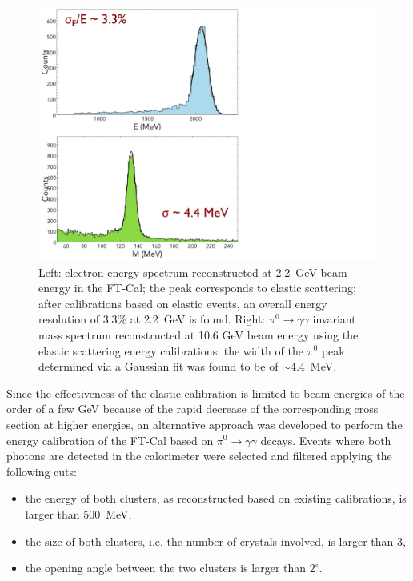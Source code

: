 \begin{figure}
\includegraphics[height=1.0\columnwidth]{fig/ftcal_elasticres.pdf}
\caption{Left: electron energy spectrum reconstructed at 2.2~GeV beam energy in the FT-Cal; the peak corresponds
  to elastic scattering; after calibrations based on elastic events, an overall energy resolution of 3.3\% at 2.2~GeV is
  found. Right: $\pi^0\to\gamma\gamma$ invariant mass spectrum reconstructed at 10.6 GeV beam energy using the
  elastic scattering energy calibrations: the width of the $\pi^0$ peak determined via a Gaussian fit was found to be
  of $\sim$4.4~MeV.}
\label{fig:ftcal_elasticres}
\end{figure}

Since the effectiveness of the elastic calibration is limited to beam energies of the order of a few GeV because of
the rapid decrease of the corresponding cross section at higher energies, an alternative approach was developed to
perform the energy calibration of the FT-Cal based on $\pi^0\to\gamma\gamma$ decays. Events where both
photons are detected in the calorimeter were selected and filtered applying the following cuts:
\begin{itemize}
    \item the energy of both clusters, as reconstructed based on existing calibrations, is larger than 500~MeV,
    \item the size of both clusters, i.e. the number of crystals involved, is larger than 3,
    \item the opening angle between the two clusters is larger than $2^\circ$.
\end{itemize}

